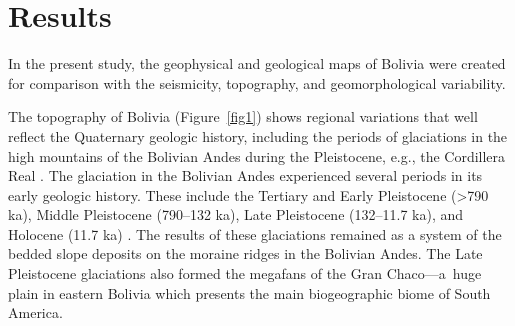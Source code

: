 \documentclass[data,article,accept,pdftex,moreauthors]{Definitions/mdpi}
\begin{document}

\section{Results}

In {the} present study{,} the geophysical{ }and geological {maps} of Bolivia were created for{ }comparison with{ the }seismicity{, }topography,{ and }geomorphological variability. 

The topography of Bolivia (Figure~\ref{fig1}) shows regional variations that well reflect {the} Quaternary geologic history{, including} the periods of glaciations {in the high} mountains {of} the Bolivian Andes {during the} Pleistocene, e.g.{, the} Cordillera Real \cite{Heine}. {The} glaciation in {the} Bolivian Andes experienced several {periods} in its early geologic history. {These} include {the} Tertiary and Early Pleistocene{ }(>790 ka), Middle Pleistocene{ }(790–132 ka){, }Late Pleistocene{ }(132–11.7 ka),{ and }Holocene{ }(11.7 ka) \cite{Frenierre}. The results of {these} glaciations remained as {a system of the} bedded slope deposits on {the} moraine ridges in the Bolivian Andes. {The} Late Pleistocene glaciations also formed {the} megafans of {the} Gran \mbox{Chaco---a huge} plain in eastern Bolivia which presents the main biogeographic biome of South America. 
\end{document}
